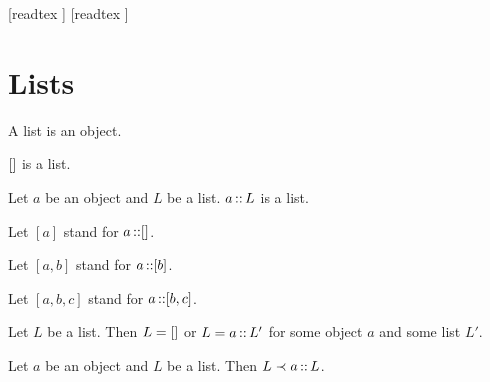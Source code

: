 \documentclass[10pt]{article}
\begin{document}
  \begin{imports}
    \begin{forthel}
      [readtex ]
      [readtex ]
    \end{forthel}
  \end{imports}


  \section*{Lists}

  \begin{forthel}
    \begin{signature}
      A list is an object.
    \end{signature}
  \end{forthel}

  \begin{forthel}
    \begin{signature}
      $[]$ is a list.
    \end{signature}
  \end{forthel}

  \begin{forthel}
    \begin{signature}
      Let $a$ be an object and $L$ be a list.
      $a \mathop{::} L$ is a list.
    \end{signature}
  \end{forthel}

  \begin{forthel}
    Let $[a]$ stand for $a \mathop{::} []$.
    
    Let $[a,b]$ stand for $a \mathop{::} [b]$.
    
    Let $[a,b,c]$ stand for $a \mathop{::} [b,c]$.
  \end{forthel}

  \begin{forthel}
    \begin{axiom}
      Let $L$ be a list.
      Then $L = []$ or $L = a \mathop{::} L'$ for some object $a$ and some list $L'$.
    \end{axiom}
  \end{forthel}

  \begin{forthel}
    \begin{axiom}
      Let $a$ be an object and $L$ be a list.
      Then $L \prec a \mathop{::} L$.
    \end{axiom}
  \end{forthel}
\end{document}

